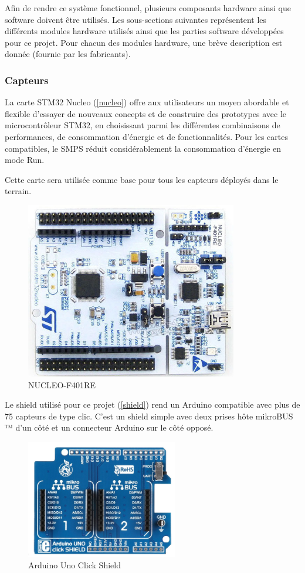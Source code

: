 \documentclass[12pt]{article}
\begin{document}
Afin de rendre ce système fonctionnel, plusieurs composants hardware ainsi que software doivent être utilisés. Les sous-sections suivantes représentent les différents modules hardware utilisés ainsi que les parties software développées pour ce projet. Pour chacun des modules hardware, une brève description est donnée (fournie par les fabricants).

\subsubsection{Capteurs}
La carte STM32 Nucleo (\autoref{nucleo}) offre aux utilisateurs un moyen abordable et flexible d'essayer de nouveaux concepts et de construire des prototypes avec le microcontrôleur STM32, en choisissant parmi les différentes combinaisons de performances, de consommation d'énergie et de fonctionnalités. Pour les cartes compatibles, le SMPS réduit considérablement la consommation d'énergie en mode Run.

Cette carte sera utilisée comme base pour tous les capteurs déployés dans le terrain.

\begin{figure}[!h]
	\centering
	\includegraphics[width=350px]{nucleo}
	\caption{NUCLEO-F401RE}
	\label{nucleo}
\end{figure}

\newpage
Le shield utilisé pour ce projet (\autoref{shield}) rend un Arduino compatible avec plus de 75 capteurs de type clic. C'est un shield simple avec deux prises hôte mikroBUS ™ d'un côté et un connecteur Arduino sur le côté opposé.

\begin{figure}[!h]
	\centering
	\includegraphics[width=250px]{shield}
	\caption{Arduino Uno Click Shield}
	\label{shield}
\end{figure}
\end{document}
